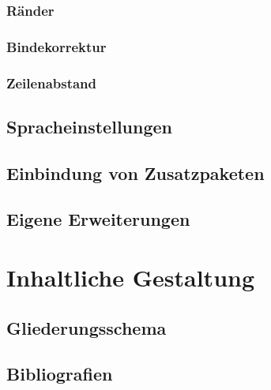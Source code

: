 \documentclass[twoside,a4paper,11pt,openright]{report}
\begin{document}
\subsection{Ränder}


\subsection{Bindekorrektur}
\label{sec:tpl:bcor}


\subsection{Zeilenabstand}


\section{Spracheinstellungen}


\section{Einbindung von Zusatzpaketen}


\section{Eigene Erweiterungen}



\chapter{Inhaltliche Gestaltung}
\label{sec:inhalt}



\section{Gliederungsschema}
\label{sec:inhalt:section}




\section{Bibliografien}
\label{sec:inhalt:literatur}

\end{document}
